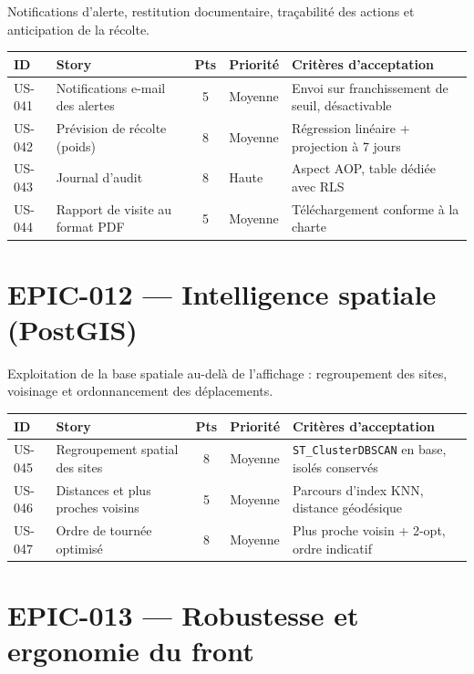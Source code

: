 Notifications d'alerte, restitution documentaire, traçabilité des actions et
anticipation de la récolte.

\begin{center}
\begin{tabular}{lp{6.6cm}cl p{4.6cm}}
\toprule
\textbf{ID} & \textbf{Story} & \textbf{Pts} & \textbf{Priorité} & \textbf{Critères d'acceptation} \\
\midrule
US-041 & Notifications e-mail des alertes    & 5  & Moyenne & Envoi sur franchissement de seuil, désactivable \\
US-042 & Prévision de récolte (poids)        & 8  & Moyenne & Régression linéaire + projection à 7 jours \\
US-043 & Journal d'audit                     & 8  & Haute   & Aspect AOP, table dédiée avec RLS \\
US-044 & Rapport de visite au format PDF     & 5  & Moyenne & Téléchargement conforme à la charte \\
\bottomrule
\end{tabular}
\end{center}

\section{EPIC-012 --- Intelligence spatiale (PostGIS)}

Exploitation de la base spatiale au-delà de l'affichage : regroupement des
sites, voisinage et ordonnancement des déplacements.

\begin{center}
\begin{tabular}{lp{6.6cm}cl p{4.6cm}}
\toprule
\textbf{ID} & \textbf{Story} & \textbf{Pts} & \textbf{Priorité} & \textbf{Critères d'acceptation} \\
\midrule
US-045 & Regroupement spatial des sites      & 8  & Moyenne & \texttt{ST\_ClusterDBSCAN} en base, isolés conservés \\
US-046 & Distances et plus proches voisins   & 5  & Moyenne & Parcours d'index KNN, distance géodésique \\
US-047 & Ordre de tournée optimisé           & 8  & Moyenne & Plus proche voisin + 2-opt, ordre indicatif \\
\bottomrule
\end{tabular}
\end{center}

\section{EPIC-013 --- Robustesse et ergonomie du front}

